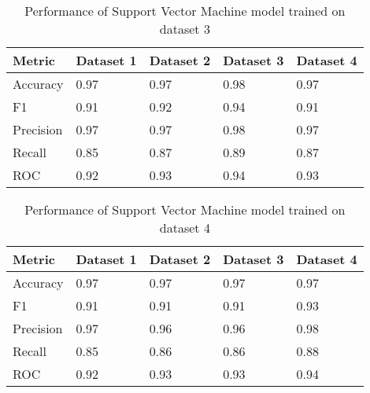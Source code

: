 {    \begin{table}[Ht!]
        \caption{Performance of Support Vector Machine model trained on dataset 3}\label{tab:performance_of_svm_model_trained_on_dataset_3}
        \begin{tabular*}{\tblwidth}{@{}LLLLL@{}}
            \toprule
            Metric & Dataset 1 & Dataset 2 & Dataset 3 & Dataset 4 \\
            \midrule
            Accuracy & 0.97 & 0.97 & 0.98 & 0.97 \\
            F1 & 0.91 & 0.92 & 0.94 & 0.91 \\
            Precision & 0.97 & 0.97 & 0.98 & 0.97 \\
            Recall & 0.85 & 0.87 & 0.89 & 0.87 \\
            ROC & 0.92 & 0.93 & 0.94 & 0.93 \\
            \bottomrule
        \end{tabular*}
    \end{table}

    \begin{table}[Ht!]
        \caption{Performance of Support Vector Machine model trained on dataset 4}\label{tab:performance_of_svm_model_trained_on_dataset_4}
        \begin{tabular*}{\tblwidth}{@{}LLLLL@{}}
            \toprule
            Metric & Dataset 1 & Dataset 2 & Dataset 3 & Dataset 4 \\
            \midrule
            Accuracy & 0.97 & 0.97 & 0.97 & 0.97 \\
            F1 & 0.91 & 0.91 & 0.91 & 0.93 \\
            Precision & 0.97 & 0.96 & 0.96 & 0.98 \\
            Recall & 0.85 & 0.86 & 0.86 & 0.88 \\
            ROC & 0.92 & 0.93 & 0.93 & 0.94 \\
            \bottomrule
        \end{tabular*}
    \end{table}
    \clearpage
}
